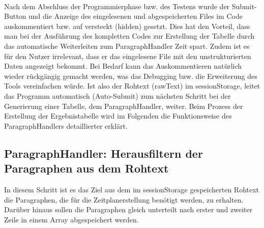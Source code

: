 {\\
 Nach dem Abschluss der Programmierphase bzw. des Testens wurde der Submit-Button und die Anzeige des eingelesenen und abgespeicherten Files im Code auskommentiert bzw. auf versteckt (hidden) gesetzt. Dies hat den Vorteil, dass man bei der Ausführung des kompletten Codes zur Erstellung der Tabelle durch das automatische Weiterleiten zum ParagraphHandler Zeit spart. Zudem ist es für den Nutzer irrelevant, dass er das eingelesene File mit den unstrukturierten Daten angezeigt bekommt. Bei Bedarf kann das Auskommentieren natürlich wieder rückgängig gemacht werden, was das Debugging bzw. die Erweiterung des Tools vereinfachen würde. 
Ist also der Rohtext (rawText) im sessionStorage, leitet das Programm automatisch (Auto-Submit) zum nächsten Schritt bei der Generierung einer Tabelle, dem ParagraphHandler, weiter. Beim Prozess der Erstellung der Ergebnistabelle wird im Folgenden die Funktionsweise des ParagraphHandlers detaillierter erklärt.

\subsection{ParagraphHandler: Herausfiltern der Paragraphen aus dem Rohtext}

In diesem Schritt ist es das Ziel aus dem im sessionStorage gespeicherten Rohtext die Paragraphen, die für die Zeitplanerstellung benötigt werden, zu erhalten. Darüber hinaus sollen die Paragraphen gleich unterteilt nach erster und zweiter Zeile in einem Array abgespeichert werden.

}
